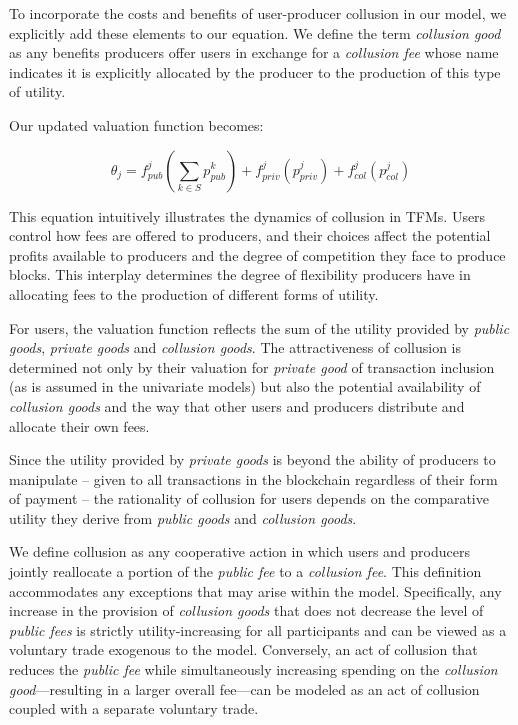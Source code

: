 \documentclass[oneside]{article}   	%
\begin{document}
To incorporate the costs and benefits of user-producer collusion in our model, we explicitly add these elements to our equation. We define the term \textit{collusion good} as any benefits producers offer users in exchange for a \textit{collusion fee} whose name indicates it is explicitly allocated by the producer to the production of this type of utility.

Our updated valuation function becomes:

$$
\theta_j = f_{pub}^j\left(\sum_{k \in S} p_{pub}^{k}\right) + f_{priv}^j(p_{priv}^j) + f_{col}^j(p_{col}^j)
$$

This equation intuitively illustrates the dynamics of collusion in TFMs. Users control how fees are offered to producers, and their choices affect the potential profits available to producers and the degree of competition they face to produce blocks. This interplay determines the degree of flexibility producers have in allocating fees to the production of different forms of utility.

For users, the valuation function reflects the sum of the utility provided by \textit{public goods}, \textit{private goods} and \textit{collusion goods}. The attractiveness of collusion is determined not only by their valuation for \textit{private good} of transaction inclusion (as is assumed in the univariate models) but also the potential availability of \textit{collusion goods} and the way that other users and producers distribute and allocate their own fees.

Since the utility provided by \textit{private goods} is beyond the ability of producers to manipulate -- given to all transactions in the blockchain regardless of their form of payment -- the rationality of collusion for users depends on the comparative utility they derive from \textit{public goods} and \textit{collusion goods}.

We define collusion as any cooperative action in which users and producers jointly reallocate a portion of the \textit{public fee} to a \textit{collusion fee}. This definition accommodates any exceptions that may arise within the model. Specifically, any increase in the provision of \textit{collusion goods} that does not decrease the level of \textit{public fees} is strictly utility-increasing for all participants and can be viewed as a voluntary trade exogenous to the model. Conversely, an act of collusion that reduces the \textit{public fee} while simultaneously increasing spending on the \textit{collusion good}—resulting in a larger overall fee—can be modeled as an act of collusion coupled with a separate voluntary trade.
\end{document}
